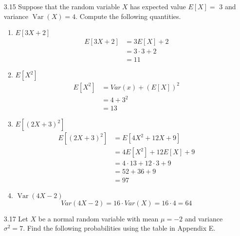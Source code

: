 \documentclass[10pt]{article}
\begin{document}
\begin{itemize}
\newpage
    \item[3.15]  Suppose that the random variable $X$ has expected value $E[X]=$ 3 and variance $\operatorname{Var}(X)=4$. Compute the following quantities.

    \begin{enumerate}
      \item  $E[3 X+2]$
            \begin{align*}
              E[3X +2] &= 3E[X] + 2 \\
                       &= 3 \cdot 3 + 2 \\
                       &= 11
            \end{align*}
      \item  $E\left[X^{2}\right]$
            \begin{align*}
              E[X^2] &=  Var(x) + (E[X])^2 \\
                    &=  4 + 3^2 \\
                    &= 13
            \end{align*}

      \item  $E[(2 X+3)^{2}]$
            \begin{align*}
              E[(2X+3)^2] &= E[4X^2 + 12X + 9] \\
                         &= 4E[X^2] + 12 E[X] + 9 \\
                         &= 4 \cdot 13 + 12 \cdot 3 + 9 \\
                         &= 52 + 36 + 9 \\
                         &= 97
            \end{align*}

      \item  $\operatorname{Var}(4 X-2)$
          \[ Var(4X-2) = 16 \cdot Var(X) = 16 \cdot 4 = 64 \]
    \end{enumerate}

\newpage
    \item[3.17]  Let $X$ be a normal random variable with mean $\mu=-2$ and variance $\sigma^{2}=7$. Find the following probabilities using the table in Appendix E.


\end{itemize}
\end{document}
